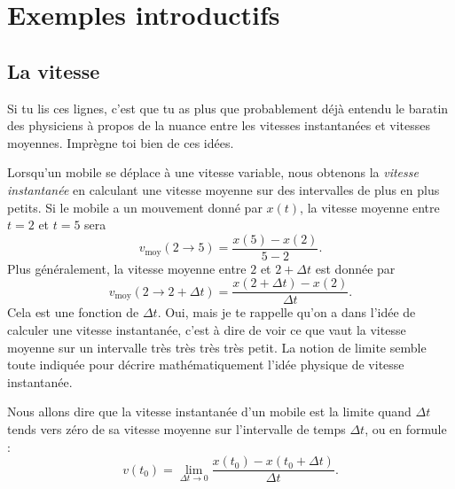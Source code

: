 
\section{Exemples introductifs}

\subsection{La vitesse}

Si tu lis ces lignes, c'est que tu as plus que probablement déjà entendu le baratin des physiciens à propos de la nuance entre les vitesses instantanées et vitesses moyennes. Imprègne toi bien de ces idées.

Lorsqu'un mobile se déplace à une vitesse variable, nous obtenons la \emph{vitesse instantanée} en calculant une vitesse moyenne sur des intervalles de plus en plus petits. Si le mobile a un mouvement donné par $x(t)$, la vitesse moyenne entre $t=2$ et $t=5$ sera
\[ 
  v_{\text{moy}}(2\to 5)=\frac{ x(5)-x(2) }{ 5-2 }.
\]
Plus généralement, la vitesse moyenne entre $2$ et $2+\Delta t$ est donnée par
\[ 
  v_{\text{moy}}(2\to 2+\Delta t)=\frac{ x(2+\Delta t)-x(2) }{ \Delta t }.
\]
Cela est une fonction de $\Delta t$. Oui, mais je te rappelle qu'on a dans l'idée de calculer une vitesse instantanée, c'est à dire de voir ce que vaut la vitesse moyenne sur un intervalle très {\small très} {\footnotesize très} {\scriptsize très} {\tiny petit}. La notion de limite semble toute indiquée pour décrire mathématiquement l'idée physique de vitesse instantanée.

Nous allons dire que la vitesse instantanée d'un mobile est la limite quand $\Delta t$ tends vers zéro de sa vitesse moyenne sur l'intervalle de temps $\Delta t$, ou en formule :
\begin{equation}		\label{Eqvinstlimite}
	v(t_0)=\lim_{\Delta t\to 0}\frac{ x(t_0)-x(t_0+\Delta t) }{ \Delta t }.
\end{equation}

